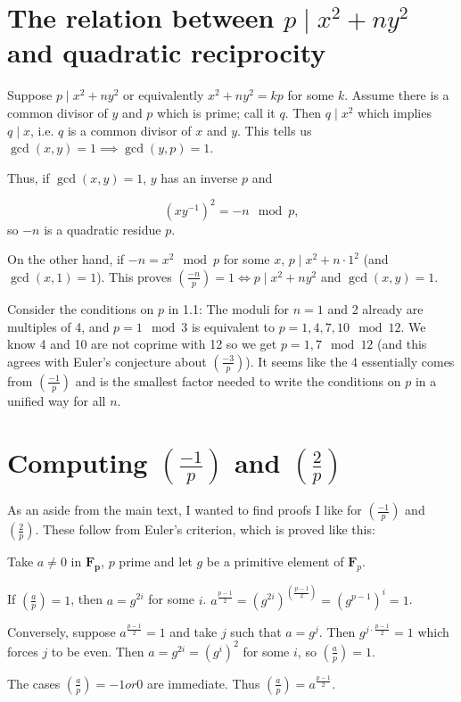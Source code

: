 \documentclass[b5paper,12pt,oneside,openright]{memoir}
\begin{document}
\section{The relation between $p\mid x^2+ny^2$ and quadratic reciprocity}
Suppose $p \mid x^2 + ny^2$ or equivalently $x^2 + ny^2 = kp$ for some $k$. Assume there is a common divisor of $y$ and $p$ which is prime; call it $q$.
Then $q\mid x^2$ which implies $q\mid x$, i.e. $q$ is a common divisor of $x$ and $y$.
This tells us $\gcd(x,y)=1 \implies \gcd(y,p)=1$.

Thus, if $\gcd(x,y)=1$, $y$ has an inverse \mod $p$ and

\[(xy^{-1})^2 = -n \mod p,\] so $-n$ is a quadratic residue \mod $p$.

On the other hand, if $-n = x^2 \mod p$ for some $x$, $p \mid x^2+n\cdot 1^2$ (and $\gcd(x,1)=1$). This proves $(\frac{-n}{p})=1 \iff p\mid x^2+ny^2$ and $\gcd(x,y)=1$.

Consider the conditions on $p$ in 1.1: The moduli for $n=1$ and 2 already are multiples of 4, and $p=1 \mod 3$ is equivalent to $p = 1, 4, 7, 10 \mod 12$. We know 4 and 10 are not coprime with 12 so we get $p=1, 7 \mod 12$ (and this agrees with Euler's conjecture about $(\frac{-3}{p})$). It seems like the 4 essentially comes from $(\frac{-1}{p})$ and is the smallest factor needed to write the conditions on $p$ in a unified way for all $n$.

\section{Computing $\left(\frac{-1}{p}\right)$ and $\left(\frac{2}{p}\right)$}

As an aside from the main text, I wanted to find proofs I like for $(\frac{-1}{p})$ and $(\frac{2}{p})$. These follow from Euler's criterion, which is proved like this:

  Take $a \neq 0$ in $\mathbf{F_p}$, $p$ prime and let $g$ be a primitive element of $\mathbf{F}_p$.

  If $(\frac{a}{p}) = 1$, then $a = g^{2i}$ for some $i$. $a^\frac{p-1}{2} = (g^{2i})^(\frac{p-1}{2}) = (g^{p-1})^i = 1$.

  Conversely, suppose $a^\frac{p-1}{2} = 1$ and take $j$ such that $a = g^j$.
  Then $g^{j\cdot\frac{p-1}{2}} = 1$ which forces $j$ to be even. Then $a = g^{2i} = (g^i)^2$ for some $i$, so $(\frac{a}{p}) = 1$.

  The cases $(\frac{a}{p}) = -1 or 0$ are immediate. Thus $(\frac{a}{p}) = a^\frac{p-1}{2}$.
\end{document}
